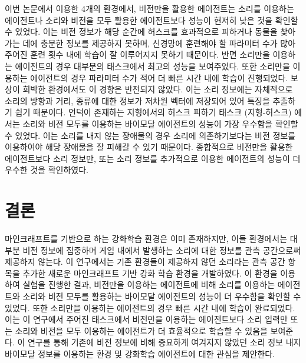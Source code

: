 \documentclass[oneside, under, ko]{snuthesis}
\begin{document}
이번 논문에서 이용한 4개의 환경에서, 비전만을 활용한 에이전트는 소리를 이용하는 에이전트나 소리와 비전을 모두 활용한 에이전트보다 성능이 현저히 낮은 것을 확인할 수 있었다. 이는 비전 정보가 해당 순간에 허스크를 효과적으로 피하거나 동물을 찾아가는 데에 충분한 정보를 제공하지 못하며, 신경망에 훈련해야 할 파라미터 수가 많아 주어진 훈련 횟수 내에 학습이 잘 이루어지지 못하기 때문이다. 반면 
소리만을 이용하는 에이전트의 경우 대부분의 태스크에서 최고의 성능을 보여주었다. 또한 소리만을 이용하는 에이전트의 경우 파라미터 수가 적어 더 빠른 시간 내에 학습이 진행되었다. 보상이 희박한 환경에서도 이 경향은 반전되지 않았다. 이는 소리 정보에는 자체적으로 소리의 방향과 거리, 종류에 대한 정보가 저차원 벡터에 저장되어 있어 특징을 추출하기 쉽기 때문이다. 언덕이 존재하는 지형에서의 허스크 피하기 태스크 (지형-허스크) 에서는 소리와 비전 모두를 이용하는 바이모달 에이전트의 성능이 가장 우수함을 확인할 수 있었다. 이는 소리를 내지 않는 장애물의 경우 소리에 의존하기보다는 비전 정보를 이용하여야 해당 장애물을 잘 피해갈 수 있기 때문이다. 종합적으로 비전만을 활용한 에이전트보다 소리 정보만, 또는 소리 정보를 추가적으로 이용한 에이전트의 성능이 더 우수한 것을 확인하였다.

\chapter{결론}\label{chp:conclusion}

마인크래프트를 기반으로 하는 강화학습 환경은 이미 존재하지만, 이들 환경에서는 대부분 비전 정보에 집중하며 게임 내에서 발생하는 소리에 대한 정보를 관측 공간으로써 제공하지 않는다. 이 연구에서는 기존 환경들이 제공하지 않던 소리라는 관측 공간 항목을 추가한 새로운 마인크래프트 기반 강화 학습 환경을 개발하였다. 이 환경을 이용하여 실험을 진행한 결과, 비전만을 이용하는 에이전트에 비해 소리를 이용하는 에이전트와 소리와 비전 모두를 활용하는 바이모달 에이전트의 성능이 더 우수함을 확인할 수 있었다. 또한 소리만을 이용하는 에이전트의 경우 빠른 시간 내에 학습이 완료되었다. 이는 이 연구에서 주어진 태스크에서 비전만을 이용하는 에이전트보다 소리 입력만 또는 소리와 비전을 모두 이용하는 에이전트가 더 효율적으로 학습할 수 있음을 보여준다. 이 연구를 통해 기존에 비전 정보에 비해 중요하게 여겨지지 않았던 소리 정보 내지 바이모달 정보를 이용하는 환경 및 강화학습 에이전트에 대한 관심을 제안한다.
\end{document}
